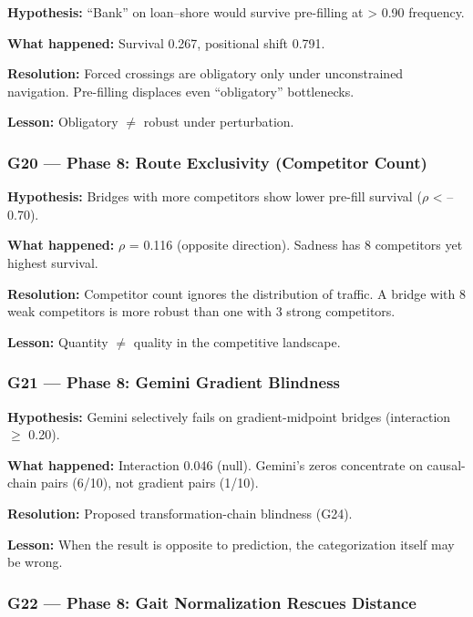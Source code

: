 \textbf{Hypothesis:} ``Bank'' on loan--shore would survive pre-filling at \textgreater{} 0.90 frequency.

\textbf{What happened:} Survival 0.267, positional shift 0.791.

\textbf{Resolution:} Forced crossings are obligatory only under unconstrained navigation. Pre-filling displaces even ``obligatory'' bottlenecks.

\textbf{Lesson:} Obligatory \(\neq\) robust under perturbation.

\subsubsection{G20 --- Phase 8: Route Exclusivity (Competitor Count)}\label{g20-phase-8-route-exclusivity-competitor-count}

\textbf{Hypothesis:} Bridges with more competitors show lower pre-fill survival (\(\rho\) \textless{} --0.70).

\textbf{What happened:} \(\rho\) = 0.116 (opposite direction). Sadness has 8 competitors yet highest survival.

\textbf{Resolution:} Competitor count ignores the distribution of traffic. A bridge with 8 weak competitors is more robust than one with 3 strong competitors.

\textbf{Lesson:} Quantity \(\neq\) quality in the competitive landscape.

\subsubsection{G21 --- Phase 8: Gemini Gradient Blindness}\label{g21-phase-8-gemini-gradient-blindness}

\textbf{Hypothesis:} Gemini selectively fails on gradient-midpoint bridges (interaction \(\geq\) 0.20).

\textbf{What happened:} Interaction 0.046 (null). Gemini's zeros concentrate on causal-chain pairs (6/10), not gradient pairs (1/10).

\textbf{Resolution:} Proposed transformation-chain blindness (G24).

\textbf{Lesson:} When the result is opposite to prediction, the categorization itself may be wrong.

\subsubsection{G22 --- Phase 8: Gait Normalization Rescues Distance}\label{g22-phase-8-gait-normalization-rescues-distance}

